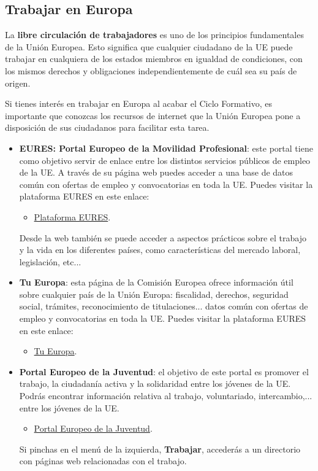 \subsection{Trabajar en Europa}
La \textbf{libre circulación de trabajadores} es uno de los principios fundamentales de la Unión Europea. Esto significa que cualquier ciudadano de la UE puede trabajar en cualquiera de los estados miembros en igualdad de condiciones, con los mismos derechos y obligaciones independientemente de cuál sea su país de origen.

Si tienes interés en trabajar en Europa al acabar el Ciclo Formativo, es importante que conozcas los recursos de internet que la Unión Europea pone a disposición de sus ciudadanos para facilitar esta tarea.

\begin{itemize}
    \item \textbf{EURES: Portal Europeo de la Movilidad Profesional}: este portal tiene como objetivo servir de enlace entre los distintos servicios públicos de empleo de la UE. A través de su página web puedes acceder a una base de datos común con ofertas de empleo y convocatorias en toda la UE. Puedes visitar la plataforma EURES en este enlace:
    \begin{itemize}
        \item \href{https://eures.ec.europa.eu/index_es}{Plataforma EURES}.
    \end{itemize}

    Desde la web también se puede acceder a aspectos prácticos sobre el trabajo y la vida en los diferentes países, como características del mercado laboral, legislación, etc...

    \vspace{5ex}

    \item \textbf{Tu Europa}: esta página de la Comisión Europea ofrece información útil sobre cualquier país de la Unión Europa: fiscalidad,  derechos, seguridad social, trámites, reconocimiento de titulaciones...
    datos común con ofertas de empleo y convocatorias en toda la UE. Puedes visitar la plataforma EURES en este enlace:
    \begin{itemize}
        \item \href{https://ec.europa.eu/youreurope/citizens/index_es.htm}{Tu Europa}.
    \end{itemize}

    \item \textbf{Portal Europeo de la Juventud}: el objetivo de este portal es promover el trabajo, la ciudadanía activa y la solidaridad entre los jóvenes de la UE. Podrás encontrar información relativa al trabajo, voluntariado, intercambio,... entre los jóvenes de la UE.
        \begin{itemize}
        \item \href{https://youth.europa.eu/go-abroad/working_es}{Portal Europeo de la Juventud}.
    \end{itemize}

    Si pinchas en el menú de la izquierda, \textbf{Trabajar}, accederás a un directorio con páginas web relacionadas con el trabajo.
\end{itemize}


